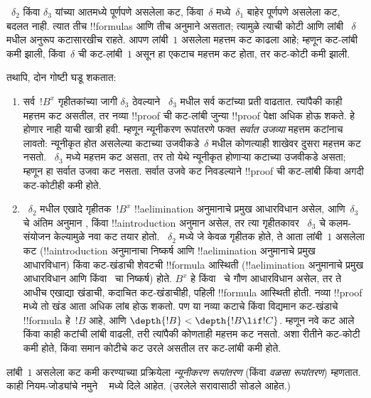 \documentclass[../../../include/open-logic-section]{subfiles}
\begin{document}
~$\delta_2$ किंवा
$\delta_3$ यांच्या
आतमध्ये पूर्णपणे असलेला
कट, किंवा~$\delta$
मध्ये~$\delta_1$
बाहेर पूर्णपणे असलेला
कट, बदलत नाही.
त्यात तीच !!{formula}s
आणि तीच अनुमाने
असतात; त्यामुळे त्याची
कोटी आणि लांबी
~$\delta$ मधील
अनुरूप कटासारखीच
राहते. आपण लांबी~$1$
असलेला महत्तम कट
काढला आहे; म्हणून
कट-लांबी कमी झाली,
किंवा~$\delta$
ची कट-लांबी~$1$
असून हा एकटाच महत्तम
कट होता, तर कट-कोटी
कमी झाली.

तथापि, दोन गोष्टी
घडू शकतात:
\begin{enumerate}
  \item सर्व~$!B^x$
  गृहीतकांच्या जागी
  $\delta_3$ ठेवल्याने
  ~$\delta_3$ मधील
  सर्व कटांच्या प्रती
  वाढतात. त्यांपैकी
  काही महत्तम कट
  असतील, तर नव्या
  !!{proof} ची कट-लांबी
  जुन्या !!{proof}
  पेक्षा अधिक होऊ
  शकते. हे होणार
  नाही याची खात्री
  हवी. म्हणून न्यूनीकरण
  रूपांतरणे फक्त
  \emph{सर्वात उजव्या}
  महत्तम कटांनाच
  लावतो: न्यूनीकृत
  होत असलेल्या कटाच्या
  उजवीकडे~$\delta$
  मधील कोणत्याही
  शाखेवर दुसरा महत्तम
  कट नसतो. ~$\delta_3$
  मध्ये महत्तम कट असता, तर
  तो येथे न्यूनीकृत
  होणाऱ्या कटाच्या
  उजवीकडे असता;
  म्हणून हा सर्वात
  उजवा कट नसता.
  सर्वात उजवे कट
  निवडल्याने !!{proof}
  ची कट-लांबी किंवा
  अगदी कट-कोटीही
  कमी होते.
  \item ~$\delta_2$
  मधील एखादे गृहीतक~$!B^x$
  !!a{elimination} अनुमानाचे
  प्रमुख आधारविधान
  असेल, आणि~$\delta_3$
  चे अंतिम अनुमान
  \Elim{\lor}, \Elim{\lexists}
  किंवा !!a{introduction}
  अनुमान असेल, तर
  त्या गृहीतकावर
  ~$\delta_3$ चे
  कलम-संयोजन केल्यामुळे
  नवा कट तयार होतो.
  ~$\delta_2$ मध्ये
  जे केवळ गृहीतक
  होते, ते आता लांबी~$1$
  असलेला कट
  (!!a{introduction}
  अनुमानाचा निष्कर्ष आणि
  !!a{elimination} अनुमानाचे
  प्रमुख आधारविधान)
  किंवा कट-खंडाची
  शेवटची !!{formula}
  आस्थिती
  (!!a{elimination}
  अनुमानाचे प्रमुख
  आधारविधान आणि
  \Elim{\lor}
  किंवा~\Elim{\lexists}
  चा निष्कर्ष)
  होते. $B^x$ हे
  \Elim{\lor}
  किंवा~\Elim{\lexists}
  चे गौण आधारविधान
  असेल, तर ते आधीच
  एखाद्या खंडाची,
  कदाचित कट-खंडाचीही,
  पहिली !!{formula}
  आस्थिती होती.
  नव्या !!{proof}
  मध्ये तो खंड
  आता अधिक लांब
  होऊ शकतो. पण
  या नव्या कटाचे
  किंवा विद्यमान
  कट-खंडाचे !!{formula}
  हे~$!B$ आहे, आणि
  $\depth{!B} < \depth{!B \lif !C}$.
  म्हणून नवे कट
  आले किंवा काही
  कटांची लांबी
  वाढली, तरी त्यांपैकी
  कोणताही महत्तम कट
  नसतो. अशा रीतीने
  कट-कोटी कमी होते,
  किंवा समान कोटीचे
  कट उरले असतील
  तर कट-लांबी कमी
  होते.
\end{enumerate}

लांबी~$1$ असलेला
कट कमी करण्याच्या
प्रक्रियेला
\emph{न्यूनीकरण रूपांतरण}
(किंवा
\emph{वळसा रूपांतरण})
म्हणतात. काही
नियम-जोड्यांचे नमुने
~
मध्ये दिले आहेत.
(उरलेले सरावासाठी
सोडले आहेत.)
\end{document}
